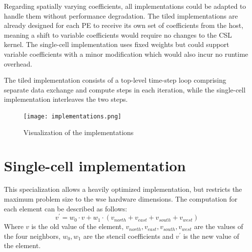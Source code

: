 Regarding spatially varying coefficients, all implementations could be adapted to handle them without performance degradation. The tiled implementations are already designed for each PE to receive its own set of coefficients from the host, meaning a shift to variable coefficients would require no changes to the CSL kernel. The single-cell implementation uses fixed weights but could support variable coefficients with a minor modification which would also incur no runtime overhead.

The tiled implementation consists of a top-level time-step loop comprising separate data exchange and compute steps in each iteration, while the single-cell implementation interleaves the two steps.

\begin{figure}
    \centering
    \texttt{[image: implementations.png]}
    \caption{Visualization of the implementations}
    \label{fig:implementations}
\end{figure}

\section{Single-cell implementation}
This specialization allows a heavily optimized implementation, but restricts the maximum problem size to the \ac{wse} hardware dimensions.
The computation for each element can be described as follows:
\begin{equation}
    \label{eq:stencil_computation}
    v^{'} = w_0 \cdot v + w_1 \cdot (v_{north} + v_{east} + v_{south} + v_{west})
\end{equation}
Where $v$ is the old value of the element, $v_{north}, v_{east}, v_{south}, v_{west}$ are the values of the four neighbors, $w_0, w_1$ are the stencil coefficients and $v^{'}$ is the new value of the element.

